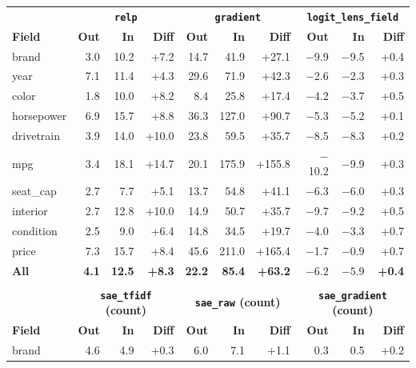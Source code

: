 \documentclass{article} %
\begin{document}
\begin{table}[h]
\footnotesize\centering
\setlength{\tabcolsep}{3pt}
\begin{tabular}{@{}l rrr | rrr | rrr@{}}
\toprule
 & \multicolumn{3}{c|}{\textbf{\texttt{relp}}} & \multicolumn{3}{c|}{\textbf{\texttt{gradient}}} & \multicolumn{3}{c}{\textbf{\texttt{logit\_lens\_field}}} \\
\textbf{Field} & \textbf{Out} & \textbf{In} & \textbf{Diff} & \textbf{Out} & \textbf{In} & \textbf{Diff} & \textbf{Out} & \textbf{In} & \textbf{Diff} \\
\midrule
brand & 3.0 & 10.2 & +7.2 & 14.7 & 41.9 & +27.1 & $-$9.9 & $-$9.5 & +0.4 \\
year & 7.1 & 11.4 & +4.3 & 29.6 & 71.9 & +42.3 & $-$2.6 & $-$2.3 & +0.3 \\
color & 1.8 & 10.0 & +8.2 & 8.4 & 25.8 & +17.4 & $-$4.2 & $-$3.7 & +0.5 \\
horsepower & 6.9 & 15.7 & +8.8 & 36.3 & 127.0 & +90.7 & $-$5.3 & $-$5.2 & +0.1 \\
drivetrain & 3.9 & 14.0 & +10.0 & 23.8 & 59.5 & +35.7 & $-$8.5 & $-$8.3 & +0.2 \\
mpg & 3.4 & 18.1 & +14.7 & 20.1 & 175.9 & +155.8 & $-$10.2 & $-$9.9 & +0.3 \\
seat\_cap & 2.7 & 7.7 & +5.1 & 13.7 & 54.8 & +41.1 & $-$6.3 & $-$6.0 & +0.3 \\
interior & 2.7 & 12.8 & +10.0 & 14.9 & 50.7 & +35.7 & $-$9.7 & $-$9.2 & +0.5 \\
condition & 2.5 & 9.0 & +6.4 & 14.8 & 34.5 & +19.7 & $-$4.0 & $-$3.3 & +0.7 \\
price & 7.3 & 15.7 & +8.4 & 45.6 & 211.0 & +165.4 & $-$1.7 & $-$0.9 & +0.7 \\
\midrule
\textbf{All} & \textbf{4.1} & \textbf{12.5} & \textbf{+8.3} & \textbf{22.2} & \textbf{85.4} & \textbf{+63.2} & $\mathbf{-6.2}$ & $\mathbf{-5.9}$ & \textbf{+0.4} \\
\bottomrule
\\[-6pt]
\toprule
 & \multicolumn{3}{c|}{\textbf{\texttt{sae\_tfidf} (count)}} & \multicolumn{3}{c|}{\textbf{\texttt{sae\_raw} (count)}} & \multicolumn{3}{c}{\textbf{\texttt{sae\_gradient} (count)}} \\
\textbf{Field} & \textbf{Out} & \textbf{In} & \textbf{Diff} & \textbf{Out} & \textbf{In} & \textbf{Diff} & \textbf{Out} & \textbf{In} & \textbf{Diff} \\
\midrule
brand & 4.6 & 4.9 & +0.3 & 6.0 & 7.1 & +1.1 & 0.3 & 0.5 & +0.2 \\

\end{tabular}
\end{table}
\end{document}
